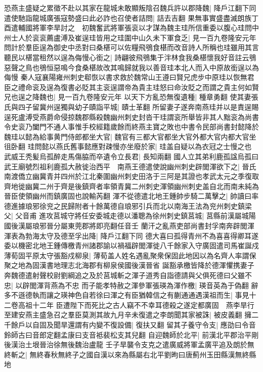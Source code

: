 恐燕主盛疑之累徵不赴以其家在龍城未敢顯叛陰召魏兵許以郡降魏|{
	降戶江翻下同}
遣使馳詣龍城廣張寇勢盛曰此必詐也召使者詰問|{
	詰去吉翻}
果無事實盛盡滅朗族丁酉遣輔國將軍李旱討之　初魏奮武將軍張衮以才謀為魏主珪所信重委以腹心珪問中州士人於衮衮薦盧溥及崔逞珪皆用之珪圍中山久未下軍食乏|{
	見一百九卷隆安元年}
問計於羣臣逞為御史中丞對曰桑椹可以佐糧飛鴞食椹而改音詩人所稱也珪雖用其言聽民以椹當租然以逞為侮慢心銜之|{
	詩翩彼飛鴞集于泮林食我桑椹懷我好音註云鴞惡聲之鳥也鴞恒惡鳴今食桑椹故改其鳴歸就我以善音珪本北人而入中原故銜逞以為侮慢}
秦人寇襄陽雍州刺史郗恢以書求救於魏常山王遵曰賢兄虎步中原珪以恢無君臣之禮命衮及逞為復書必貶其主衮逞謂帝為貴主珪怒曰命汝貶之而謂之貴主何如賢兄也逞之降魏也|{
	見一百九卷隆安元年}
以天下方亂恐無復遺種|{
	種章勇翻}
使其妻張氏與四子留冀州逞獨與幼子賾詣平城|{
	賾士革翻}
所留妻子遂奔南燕珪并以是責逞賜逞死盧溥受燕爵命侵掠魏郡縣殺魏幽州刺史封沓干珪謂衮所舉皆非其人黜衮為尚書令史衮乃闔門不通人事惟手校經籍歲餘而終燕主寶之敗也中書令民部尚書封懿降於魏珪以懿為給事黄門侍郎都坐大官|{
	魏官有三都大官都坐大官外都大官内都大官坐徂卧翻}
珪問懿以燕氏舊事懿應對疎慢亦坐廢於家|{
	珪盖自疑以為衣冠之士慢之也}
武威王秃髪烏孤醉走馬傷脇而卒遺令立長君|{
	長知兩翻}
國人立其弟利鹿孤諡烏孤曰武王廟號烈祖利鹿孤大赦徙治西平　南燕王德遣使說幽州刺史辟閭渾欲下之|{
	晉氏南渡僑立幽冀青并四州於江北秦圍幽州刺史田洛于三阿是其證也孝武太元之季復取齊地徙幽冀二州于齊是後鎮齊者率領青冀二州刺史渾領幽州刺史盖自北而南未純為晉臣使領幽州而鎮廣固也說輸芮翻}
渾不從德遣北地王鍾帥步騎二萬擊之|{
	帥讀曰率}
德進據琅邪徐兖之民歸附者十餘萬德自琅邪引兵而北以南海王法為兖州刺史鎮梁父|{
	父音甫}
進攻莒城守將任安委城走德以潘聰為徐州刺史鎮莒城|{
	莒縣前漢屬城陽國後漢屬琅邪晉分屬東莞郡將即亮翻任音壬}
蘭汗之亂燕吏部尚書封孚南奔辟閭渾渾表為勃海太守及德至孚出降|{
	降戶江翻下同}
德大喜曰孤得青州不為喜喜得卿耳遂委以機密北地王鍾傳檄青州諸郡諭以禍福辟閭渾徙八千餘家入守廣固遣司馬崔誕戍薄荀固平原太守張豁戍柳泉|{
	薄荀盖人姓名遇亂聚衆保固此地因以為名齊人率謂保聚之地為固漢書地理志北海郡有柳泉侯國後漢晉省}
誕豁承檄皆降於德渾懼携妻子奔魏德遣射聲校尉劉綱追之及於莒城斬之渾子道秀自詣德請與父俱死德曰父雖不忠|{
	以辟閭渾背燕為不忠}
而子能孝特赦之渾參軍張瑛為渾作檄|{
	瑛音英為于偽翻}
辭多不遜德執而讓之瑛神色自若徐曰渾之有臣猶韓信之有蒯通通遇漢祖而生|{
	事見十二卷高祖十二年}
臣遭陛下而死比之古人竊不不幸耳德殺之遂定都廣固　燕李旱行至建安燕主盛急召之羣臣莫測其故九月辛未復遣之李朗聞其家被誅|{
	被皮義翻}
擁二千餘戶以自固及聞旱還謂有内變不復設備|{
	復扶又翻}
留其子養守令支|{
	應劭曰令音鈴師古曰音郎定翻孟康曰支音袛裴松支其兒翻}
自迎魏師於北平|{
	前漢北平郡治平剛後漢治土垠晉治徐無後魏治盧龍}
壬子旱襲令支克之遣廣威將軍孟廣平追及朗於無終斬之|{
	無終春秋無終子之國自漢以來為縣屬右北平劉昫曰唐薊州玉田縣漢無終縣地}
